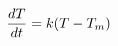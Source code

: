 \documentclass[preview]{standalone}
\begin{document}
\begin{align*}
\special{dvisvgm:raw <g id='unique000'>}\frac{dT}{dt} = k(T - T_m)\special{dvisvgm:raw </g>}
\end{align*}
\end{document}
